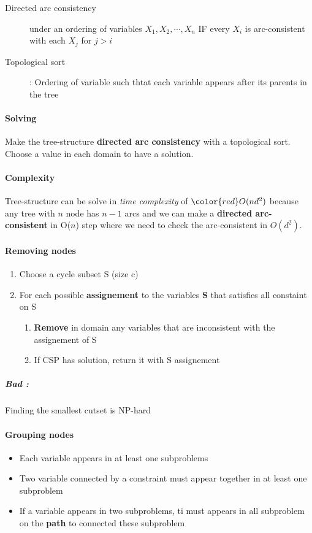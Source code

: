 \begin{description}
    \item[Directed arc consistency] under an ordering of variables $X_1, X_2, \cdots, X_n$
        IF every $X_i$ is arc-consistent with each $X_j$ for $j > i$
    \item[Topological sort] : Ordering of variable such thtat each variable 
        appears after its parents in the tree
\end{description}

\paragraph{Solving} Make the tree-structure \textbf{directed arc consistency} with
a topological sort. Choose a value in each domain to have a solution.

\paragraph{Complexity}
Tree-structure  can be  solve in  \textit{time complexity}  of $\color{red} O(nd^2)$
because  any tree  with  $n$ node  has  $n-1$  arcs and  we  can make  a
\textbf{directed arc-consistent} in  O($n$) step where we  need to check
the arc-consistent in $O(d^2)$.


\paragraph{Removing nodes}
\begin{enumerate}
    \item Choose a cycle subset S (size c)
    \item For each possible \textbf{assignement} to the variables \textbf{S} that satisfies all constaint on S
        \begin{enumerate}
            \item \textbf{Remove} in domain any variables that are inconsistent with the assignement of S
            \item If CSP has solution, return it with S assignement
        \end{enumerate}
\end{enumerate}

\subparagraph{Bad :} Finding the smallest cutset is NP-hard


\paragraph{Grouping nodes}
\begin{itemize}
    \item Each variable appears in at least one subproblems
    \item Two variable connected by a constraint must appear together
        in at least one subproblem
    \item If a variable appears in two subproblems, ti must appears in all subproblem
        on the \textbf{path} to connected these subproblem
\end{itemize}

